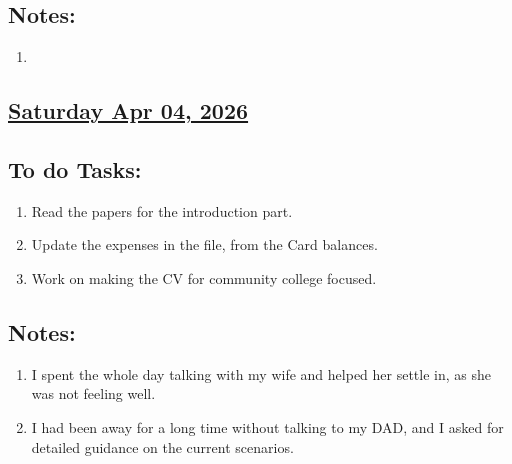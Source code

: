 \subsection*{Notes:}
\begin{enumerate}
    \item 
\end{enumerate}
\subsection*{\underline{Saturday Apr 04, 2026} }
\subsection*{To do Tasks:}
\begin{enumerate}
    \item Read the papers for the introduction part. \xmark
    \item Update the expenses in the file, from the Card balances. \xmark
    \item Work on making the CV for community college focused. \xmark
\end{enumerate}
\subsection*{Notes:}
\begin{enumerate}
    \item I spent the whole day talking with my wife and helped her settle in, as she was not feeling well. 
    \item I had been away for a long time without talking to my DAD, and I asked for detailed guidance on the current scenarios. 
\end{enumerate}
\stardivider
